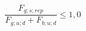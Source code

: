 \documentclass[12pt]{article}
\begin{document}
\begin{displaymath}
\frac {F_{g;s;rep}} {F_{g;u;d} + F_{b;u;d}} \leq 1,0
\end{displaymath}
\end{document}
